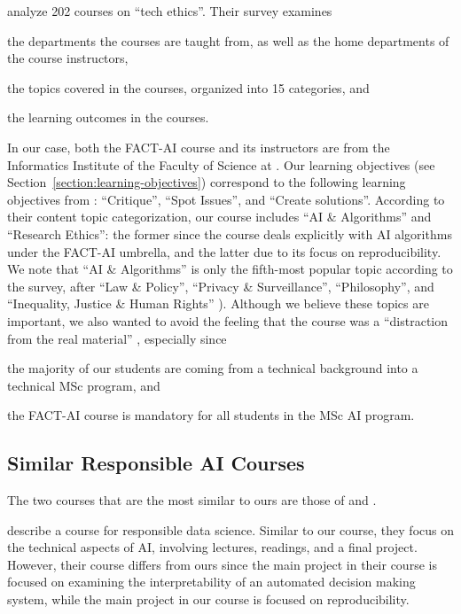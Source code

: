 \citet{fiesler2020we} analyze 202 courses on ``tech ethics''. 
Their survey examines 
\begin{enumerate*}[label=(\roman*)]
\item the departments the courses are taught from, as well as the home departments of the course instructors, 
\item the topics covered in the courses, organized into 15 categories, and 
\item the learning outcomes in the courses. 
\end{enumerate*}
In our case, both the FACT-AI course and its instructors are from the Informatics Institute of the Faculty of Science at \OurUniversity{}. Our learning objectives (see Section~\ref{section:learning-objectives}) correspond to the following learning objectives from \citet{fiesler2020we}: ``Critique'', ``Spot Issues'', and ``Create solutions''. 
According to their content topic categorization, our course includes ``AI \& Algorithms'' and ``Research Ethics'': the former since the course deals explicitly with \ac{AI} algorithms under the FACT-AI umbrella, and the latter due to its focus on reproducibility. 
We note that ``AI \& Algorithms'' is only the fifth-most popular topic according to the survey, after ``Law \& Policy'', ``Privacy \& Surveillance'', ``Philosophy'', and ``Inequality, Justice \& Human Rights'' \citep[see Table 2,][]{fiesler2020we}). 
Although we believe these topics are important, we also wanted to avoid the feeling that the course was a ``distraction from the real material'' \cite{lewis2021teaching}, especially since 
\begin{enumerate*}[label=(\roman*)]
\item the majority of our students are coming from a technical background into a technical MSc program, and 
\item the FACT-AI course is mandatory for all students in the MSc AI program. 
\end{enumerate*}

\subsection{Similar Responsible AI Courses}
The two courses that are the most similar to ours are those of \citet{lewis2021teaching} and \citet{yildiz2021reproducedpapers}. 

\citet{lewis2021teaching} describe a course for responsible data science. 
Similar to our course, they focus on the technical aspects of AI, involving lectures, readings, and a final project. 
However, their course differs from ours since the main project in their course is focused on examining the interpretability of an automated decision making system, while the main project in our course is focused on reproducibility. 

